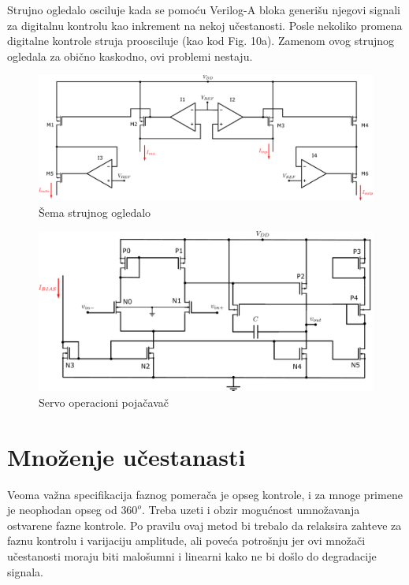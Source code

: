 \documentclass[journal,twocolumn,letterpaper]{IEEEJERM}
\begin{document}
Strujno ogledalo osciluje kada se pomoću Verilog-A bloka generišu njegovi signali za digitalnu kontrolu kao inkrement na nekoj učestanosti. Posle nekoliko promena digitalne kontrole struja proosciluje (kao kod \cite{zeki07} Fig. 10a). Zamenom ovog strujnog ogledala za obično kaskodno, ovi problemi nestaju.

\begin{figure}[!htbp]
  \centering
  \includegraphics[width=\linewidth]{mirror_detail.pdf}
  \caption{Šema strujnog ogledalo}
  \label{fig:mirror_detail}
\end{figure}


\begin{figure}[!htbp]
  \centering
  \includegraphics[width=\linewidth]{servo_oa.pdf}
  \caption{Servo operacioni pojačavač}
  \label{fig:servo_oa}
\end{figure}

\section{Množenje učestanasti}

Veoma važna specifikacija faznog pomerača je opseg kontrole, i za mnoge primene je neophodan opseg od $360^o$. Treba uzeti i obzir mogućnost umnožavanja ostvarene fazne kontrole. Po pravilu ovaj metod bi trebalo da relaksira zahteve za faznu kontrolu i varijaciju amplitude, ali poveća potrošnju jer ovi množači učestanosti moraju biti malošumni i linearni kako ne bi došlo do degradacije signala. \cite{ellinger10}
\end{document}
